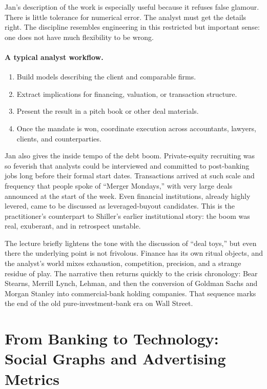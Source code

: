 Jan's description of the work is especially useful because it refuses false glamour. There is little tolerance for numerical error. The analyst must get the details right. The discipline resembles engineering in this restricted but important sense: one does not have much flexibility to be wrong.

\paragraph{A typical analyst workflow.}
\begin{enumerate}
\item Build models describing the client and comparable firms.
\item Extract implications for financing, valuation, or transaction structure.
\item Present the result in a pitch book or other deal materials.
\item Once the mandate is won, coordinate execution across accountants, lawyers, clients, and counterparties.
\end{enumerate}

Jan also gives the inside tempo of the debt boom. Private-equity recruiting was so feverish that analysts could be interviewed and committed to post-banking jobs long before their formal start dates. Transactions arrived at such scale and frequency that people spoke of ``Merger Mondays,'' with very large deals announced at the start of the week. Even financial institutions, already highly levered, came to be discussed as leveraged-buyout candidates. This is the practitioner's counterpart to Shiller's earlier institutional story: the boom was real, exuberant, and in retrospect unstable.

The lecture briefly lightens the tone with the discussion of ``deal toys,'' but even there the underlying point is not frivolous. Finance has its own ritual objects, and the analyst's world mixes exhaustion, competition, precision, and a strange residue of play. The narrative then returns quickly to the crisis chronology: Bear Stearns, Merrill Lynch, Lehman, and then the conversion of Goldman Sachs and Morgan Stanley into commercial-bank holding companies. That sequence marks the end of the old pure-investment-bank era on Wall Street.

\section{From Banking to Technology: Social Graphs and Advertising Metrics}

